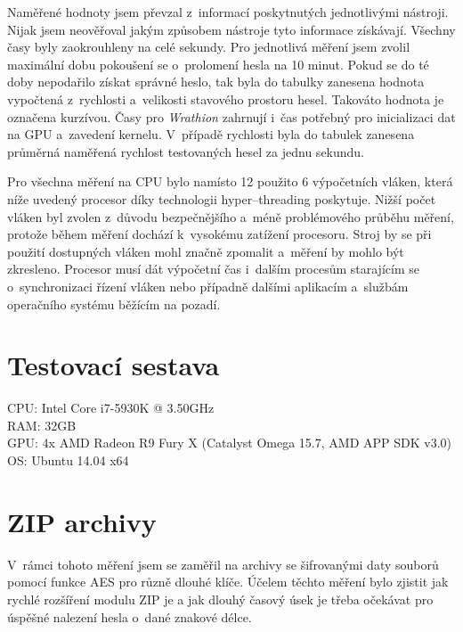 Naměřené hodnoty jsem převzal z~informací poskytnutých jednotlivými nástroji. Nijak jsem
neověřoval jakým způsobem nástroje tyto informace získávají. Všechny časy byly zaokrouhleny na
celé sekundy. Pro jednotlivá měření jsem zvolil maximální dobu pokoušení se o~prolomení hesla na
10 minut. Pokud se do té doby nepodařilo získat správné heslo, tak byla do tabulky zanesena
hodnota vypočtená z~rychlosti a~velikosti stavového prostoru hesel. Takováto hodnota je označena
kurzívou. Časy pro {\it Wrathion} zahrnují i~čas potřebný pro inicializaci dat na GPU a~zavedení
kernelu. V~případě rychlosti byla do tabulek zanesena průměrná naměřená rychlost testovaných
hesel za jednu sekundu.

Pro všechna měření na CPU bylo namísto 12 použito 6 výpočetních vláken, která níže uvedený
procesor díky technologii hyper--threading poskytuje. Nižší počet vláken byl zvolen z~důvodu
bezpečnějšího a~méně problémového průběhu měření, protože během měření dochází k~vysokému zatížení
procesoru. Stroj by se při použití dostupných vláken mohl značně zpomalit a~měření by mohlo být
zkresleno. Procesor musí dát výpočetní čas i~dalším procesům starajícím se o~synchronizaci řízení
vláken nebo případně dalšími aplikacím a~službám operačního systému běžícím na pozadí.  

\section{Testovací sestava}
CPU: Intel Core i7-5930K @ 3.50GHz\\
RAM: 32GB\\
GPU: 4x AMD Radeon R9 Fury X (Catalyst Omega 15.7, AMD APP SDK v3.0)\\
OS: Ubuntu 14.04 x64
\section{ZIP archivy}
V~rámci tohoto měření jsem se zaměřil na archivy se šifrovanými daty souborů pomocí funkce AES
pro různě dlouhé klíče. Účelem těchto měření bylo zjistit jak rychlé rozšíření modulu ZIP je a
jak dlouhý časový úsek je třeba očekávat pro úspěšné nalezení hesla o~dané znakové délce. 

